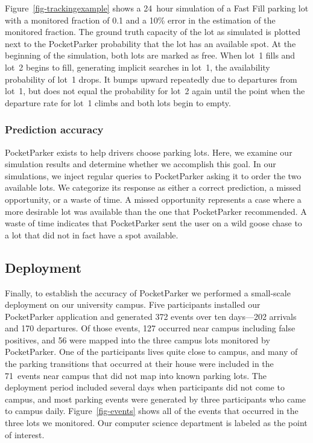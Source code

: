 Figure~\ref{fig-trackingexample} shows a 24~hour simulation of a Fast Fill
parking lot with a monitored fraction of 0.1 and a 10\% error in the
estimation of the monitored fraction. The ground truth capacity of the lot as
simulated is plotted next to the PocketParker probability that the lot has an
available spot. At the beginning of the simulation, both lots are marked as
free. When lot~1 fills and lot~2 begins to fill, generating implicit searches
in lot~1, the availability probability of lot~1 drops. It bumps upward
repeatedly due to departures from lot~1, but does not equal the probability
for lot~2 again until the point when the departure rate for lot~1 climbs and
both lots begin to empty.

\subsubsection{Prediction accuracy}

PocketParker exists to help drivers choose parking lots. Here, we examine our
simulation results and determine whether we accomplish this goal. In our
simulations, we inject regular queries to PocketParker asking it to order the
two available lots. We categorize its response as either a correct
prediction, a missed opportunity, or a waste of time. A missed opportunity
represents a case where a more desirable lot was available than the one that
PocketParker recommended. A waste of time indicates that PocketParker sent
the user on a wild goose chase to a lot that did not in fact have a spot
available.

\subsection{Deployment}

Finally, to establish the accuracy of PocketParker we performed a small-scale
deployment on our university campus. Five participants installed our
PocketParker application and generated 372 events over ten days---202
arrivals and 170 departures. Of those events, 127 occurred near campus
including false positives, and 56 were mapped into the three campus lots
monitored by PocketParker. One of the participants lives quite close to
campus, and many of the parking transitions that occurred at their house were
included in the 71~events near campus that did not map into known parking
lots. The deployment period included several days when participants did not
come to campus, and most parking events were generated by three participants
who came to campus daily. Figure~\ref{fig-events} shows all of the events
that occurred in the three lots we monitored. Our computer science department
is labeled as the point of interest.

